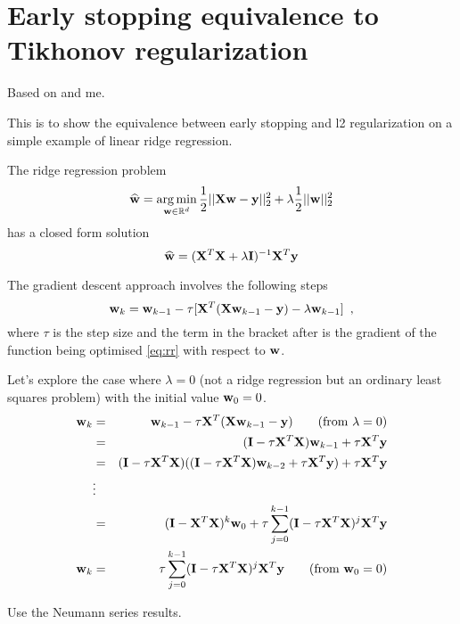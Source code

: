 
\clearpage


\section{Early stopping equivalence to Tikhonov regularization}\label{sec:Early stopping}

Based on \cite{MIT2017} and me.

This is to show the equivalence between early stopping and l2 regularization on a simple example of linear ridge regression.

The ridge regression problem
\begin{equation}\label{eq:rr}
\widehat{\mathbf{w}} = \operatorname*{arg\,min}_{\mathbf{w} \in \mathbb{R}^d} \frac{1}{2}||\mathbf{X} \mathbf{w} - \mathbf{y}||_2^2 + \lambda \frac{1}{2}||\mathbf{w}||_2^2
\end{equation}
has a closed form solution
\begin{equation*}
\widehat{\mathbf{w}} = (\mathbf{X}^T \mathbf{X} + \lambda \mathbf{I})^{-1} \mathbf{X}^T \mathbf{y}
\end{equation*}

The gradient descent approach involves the following steps
\begin{equation*}
\mathbf{w}_k = \mathbf{w}_{k-1} - \tau [ \mathbf{X}^T (\mathbf{X} \mathbf{w}_{k-1} - \mathbf{y}) - \lambda \mathbf{w}_{k-1}] \enspace,
\end{equation*}
where $\tau$ is the step size and the term in the bracket after is the gradient of the function being optimised \eqref{eq:rr} with respect to $\mathbf{w}$.

Let's explore the case where $\lambda=0$ (not a ridge regression but an ordinary least squares problem) with the initial value $\mathbf{w}_0 = 0$.
\begin{eqnarray}\label{eq:GradDescent}
\mathbf{w}_k & = & \mathbf{w}_{k-1} - \tau \mathbf{X}^T (\mathbf{X} \mathbf{w}_{k-1} - \mathbf{y}) \qquad (\text{from } \lambda=0) \nonumber \\ 
& = & (\mathbf{I} - \tau \mathbf{X}^T \mathbf{X}) \mathbf{w}_{k-1} + \tau \mathbf{X}^T \mathbf{y} \nonumber \\
& = & (\mathbf{I} - \tau \mathbf{X}^T \mathbf{X}) ((\mathbf{I} - \tau \mathbf{X}^T \mathbf{X}) \mathbf{w}_{k-2} + \tau \mathbf{X}^T \mathbf{y}) + \tau \mathbf{X}^T \mathbf{y} \nonumber \\
& \vdots & \nonumber \\
& = & (\mathbf{I} - \mathbf{X}^T \mathbf{X})^k \mathbf{w}_{0} + \tau \sum_{j=0}^{k-1} (\mathbf{I} - \tau \mathbf{X}^T \mathbf{X})^j \mathbf{X}^T \mathbf{y} \nonumber \\
\mathbf{w}_k & = & \tau \sum_{j=0}^{k-1} (\mathbf{I} - \tau \mathbf{X}^T \mathbf{X})^j \mathbf{X}^T \mathbf{y} \qquad (\text{from } \mathbf{w}_0=0)
\end{eqnarray}

Use the Neumann series results.

